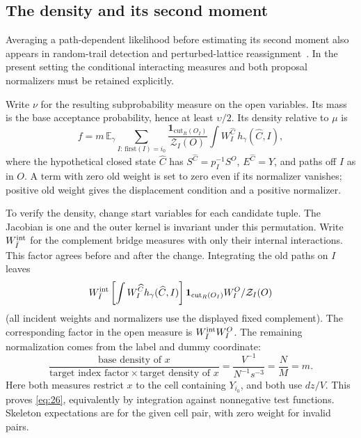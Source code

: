 \subsection{The density and its second moment}

Averaging a path-dependent likelihood before estimating its second
moment also appears in random-trail detection and perturbed-lattice
reassignment~\cite{AriasCastroCandesHelgasonZeitouni2008,
BergerPeres2013,PeresSly2014}. In the present setting the conditional
interacting measures and both proposal normalizers must be retained
explicitly.

Write \(\nu\) for the resulting subprobability measure on the open
variables. Its mass is the base acceptance probability, hence at least
\(\upsilon/2\). Its density relative to \(\mu\) is
\[
 f = m\,\mathbb E_\gamma\sum_{I:\,\mathrm{first}(I)=i_0}
       \frac{\mathbf 1_{\mathrm{cut}_R(O_I)}}{\mathcal Z_I(O)}
              \int W_I^{\widehat C}\, h_\gamma(\widehat C,I),                             \tag{26}\label{eq:26}
\]
where the hypothetical closed state \(\widehat C\) has
\(S^{\widehat C}=p_I^{-1}S^O\), \(E^{\widehat C}=Y\), and paths off
\(I\) as in \(O\). A term with zero old weight is set to zero even
if its normalizer vanishes; positive old weight gives the displacement
condition and a positive normalizer.

To verify the density, change start variables for each candidate tuple.
The Jacobian is one and the outer kernel is invariant under this
permutation. Write \(W_{\bar I}^{\rm int}\) for the complement bridge
measures with only their internal interactions. This factor agrees
before and after the change. Integrating the old paths on \(I\) leaves
\[
 W_{\bar I}^{\rm int}
   \left[\int W_I^{\widehat C} h_\gamma(\widehat C,I)\right]
     \mathbf 1_{\mathrm{cut}_R(O_I)}W_I^O/\mathcal Z_I(O)
\]
(all incident weights and normalizers use the displayed fixed complement).
The corresponding factor in the open measure is
\(W_{\bar I}^{\rm int}W_I^O\). The remaining normalization comes from
the label and dummy coordinate:
\[
 \frac{\text{base density of }x}
      {\text{target index factor}\times\text{target density of }x}
 =\frac{V^{-1}}{N^{-1}s^{-3}}=\frac{N}{M}=m.
\]
Here both measures restrict $x$ to the cell containing $Y_{i_0}$,
and both use $dz/V$. This proves \eqref{eq:26}, equivalently by
integration against nonnegative test functions. Skeleton expectations
are for the given cell pair, with zero weight for invalid pairs.

